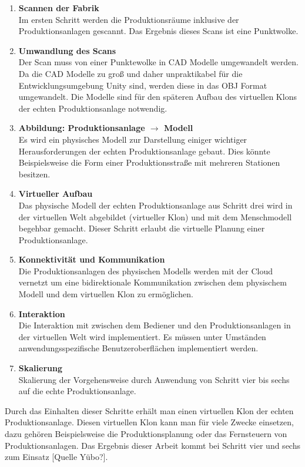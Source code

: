 \begin{enumerate}
	\item \textbf{Scannen der Fabrik} \\
	Im ersten Schritt werden die Produktionsräume inklusive der Produktionsanlagen gescannt. Das Ergebnis dieses Scans ist eine Punktwolke.
	\item \textbf{Umwandlung des Scans} \\
	Der Scan muss von einer Punktewolke in CAD Modelle umgewandelt werden. Da die CAD Modelle zu groß und daher unpraktikabel für die Entwicklungsumgebung Unity sind, werden diese in das OBJ Format umgewandelt. Die Modelle sind für den späteren Aufbau des virtuellen Klons der echten Produktionsanlage notwendig.
	\item \textbf{Abbildung: Produktionsanlage $\rightarrow$ Modell} \\
	Es wird ein physisches Modell zur Darstellung einiger wichtiger Herausforderungen der echten Produktionsanlage gebaut. Dies könnte Beispielsweise die Form einer Produktionsstraße mit mehreren Stationen besitzen.
	\item \textbf{Virtueller Aufbau} \\
	Das physische Modell der echten Produktionsanlage aus Schritt drei wird in der virtuellen Welt abgebildet (virtueller Klon) und mit dem Menschmodell begehbar gemacht. Dieser Schritt erlaubt die virtuelle Planung einer Produktionsanlage.
	\item \textbf{Konnektivität und Kommunikation} \\
	Die Produktionsanlagen des physischen Modells werden mit der Cloud vernetzt um eine bidirektionale Kommunikation zwischen dem physischem Modell und dem virtuellen Klon zu ermöglichen.
	\item \textbf{Interaktion} \\
	Die Interaktion mit zwischen dem Bediener und den Produktionsanlagen in der virtuellen Welt wird implementiert. Es müssen unter Umständen anwendungsspezifische Benutzeroberflächen implementiert werden.
	\item \textbf{Skalierung} \\
	Skalierung der Vorgehensweise durch Anwendung von Schritt vier bis sechs auf die echte Produktionsanlage.
\end{enumerate}
Durch das Einhalten dieser Schritte erhält man einen virtuellen Klon der echten Produktionsanlage. Diesen virtuellen Klon kann man für viele Zwecke einsetzen, dazu gehören Beispielsweise die Produktionsplanung oder das Fernsteuern von Produktionsanlagen. Das Ergebnis dieser Arbeit kommt bei Schritt vier und sechs zum Einsatz [Quelle Yübo?].

